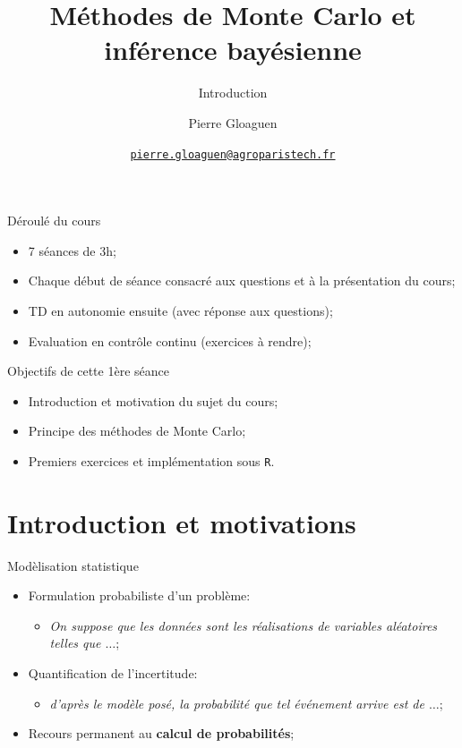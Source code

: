 \documentclass[ignorenonframetext,]{beamer}
\title{Méthodes de Monte Carlo et inférence bayésienne}
\subtitle{Introduction}
\author{Pierre Gloaguen}
\date{\href{mailto:pierre.gloaguen@agroparistech.fr}{\nolinkurl{pierre.gloaguen@agroparistech.fr}}}
\providecommand{\tightlist}{%
  \setlength{\itemsep}{0pt}\setlength{\parskip}{0pt}}
\begin{document}
\frame{\titlepage}

\begin{frame}{Déroulé du cours}
\protect\hypertarget{duxe9rouluxe9-du-cours}{}

\begin{itemize}
\tightlist
\item
  7 séances de 3h;
\item
  Chaque début de séance consacré aux questions et à la présentation du
  cours;
\item
  TD en autonomie ensuite (avec réponse aux questions);
\item
  Evaluation en contrôle continu (exercices à rendre);
\end{itemize}

\end{frame}

\begin{frame}[fragile]{Objectifs de cette 1ère séance}
\protect\hypertarget{objectifs-de-cette-1uxe8re-suxe9ance}{}

\begin{itemize}
\tightlist
\item
  Introduction et motivation du sujet du cours;
\item
  Principe des méthodes de Monte Carlo;
\item
  Premiers exercices et implémentation sous \texttt{R}.
\end{itemize}

\end{frame}

\hypertarget{introduction-et-motivations}{%
\section{Introduction et
motivations}\label{introduction-et-motivations}}

\begin{frame}{Modèlisation statistique}
\protect\hypertarget{moduxe8lisation-statistique}{}

\begin{itemize}
\tightlist
\item
  Formulation probabiliste d'un problème:

  \begin{itemize}
  \tightlist
  \item
    \emph{On suppose que les données sont les réalisations de variables
    aléatoires telles que \(\dots\)};
  \end{itemize}
\item
  Quantification de l'incertitude:

  \begin{itemize}
  \tightlist
  \item
    \emph{d'après le modèle posé, la probabilité que tel événement
    arrive est de \(\dots\)};
  \end{itemize}
\item
  Recours permanent au \textbf{calcul de probabilités};
\end{itemize}

\end{frame}
\end{document}
